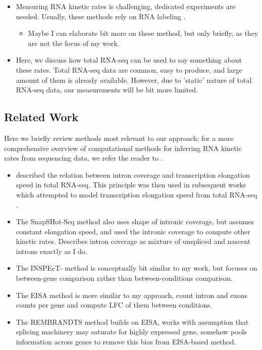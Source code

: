 \documentclass[11pt]{article}
\begin{document}
\begin{itemize}
        \item Measuring RNA kinetic rates is challenging, dedicated experiments are needed. Usually, these methods rely on RNA labeling \citep{furlanDynamicsTranscriptionalPosttranscriptional2021}.
        \begin{itemize}
            \item Maybe I can elaborate bit more on these method, but only briefly, as they are not the focus of my work.
        \end{itemize}

        \item Here, we discuss how total RNA-seq can be used to say something about these rates. Total RNA-seq data are common, easy to produce, and large amount of them is already available. However, due to 'static' nature of total RNA-seq data, our measurements will be bit more limited.

    \end{itemize}

    \subsection{Related Work}
    Here we briefly review methods most relevant to our approach; for a more comprehensive overview of computational methods for inferring RNA kinetic rates from sequencing data, we refer the reader to \citet{furlanDynamicsTranscriptionalPosttranscriptional2021}.
    \begin{itemize}
        \item \citet{ameurTotalRNASequencing2011} described the relation between intron coverage and transcription elongation speed in total RNA-seq. This principle was then used in subsequent works which attempted to model transcription elongation speed from total RNA-seq \citep{jonkersGenomewideDynamicsPol2014, kawamuraStatisticalInferenceRate2019, debesAgeingassociatedChangesTranscriptional2023}.
        \item The SnapSHot-Seq method \citep{graySnapShotSeqMethodExtracting2014} also uses shape of intronic coverage, but assumes constant elongation speed, and used the intronic coverage to compute other kinetic rates. Describes intron coverage as mixture of unspliced and nascent introns exactly as I do.
        \item The INSPEcT- method \citep{furlanGenomewideDynamicsRNA2020} is conceptually bit similar to my work, but focuses on between-gene comparison rather than between-conditions comparison.
        \item The EISA method \citep{gaidatzisAnalysisIntronicExonic2015} is more similar to my approach, count intron and exons counts per gene and compute LFC of them between conditions.
        \item The REMBRANDTS method \citep{alkallasInferenceRNADecay2017} builds on EISA, works with assumption that splicing machinery may saturate for highly expressed gene, somehow pools information across genes to remove this bias from EISA-based method.
    \end{itemize}
\end{document}
